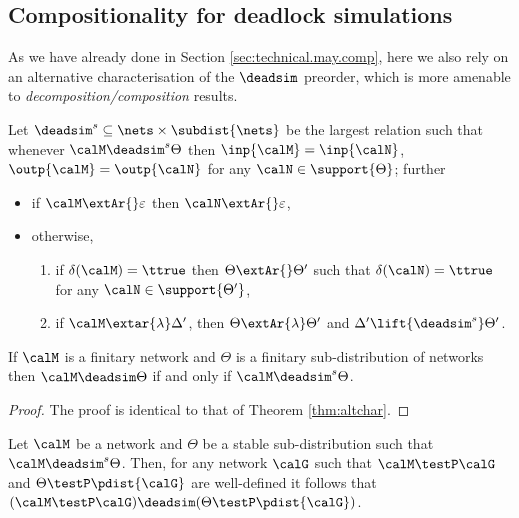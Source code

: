 \documentclass{LMCS}
\begin{document}
\subsection{Compositionality for deadlock simulations}
\label{sec:technical.must.comp}


As we have already done in Section \ref{sec:technical.may.comp},
here we also rely on an alternative characterisation of the 
$\deadsim$ preorder, which is more amenable to \emph{decomposition/composition}
results.



\begin{defi}
Let $\deadsim^s \subseteq \nets \times \subdist{\nets}$ be 
the largest relation such that whenever $\calM \deadsim^s \Theta$ 
then $\inp{\calM} = \inp{\calN}$, $\outp{\calM} = \outp{\calN}$ 
for any $\calN \in \support{\Theta}$; further 
\begin{itemize}
\item if $\calM \extAr{} \varepsilon$ then $\calN \extAr{}\varepsilon$, 
\item otherwise, 
\begin{enumerate}[label=(\roman*)]
	\item if $\delta(\calM) = \ttrue$ then $\Theta \extAr{} \Theta'$ 
	such that $\delta(\calN) = \ttrue$ for any $\calN \in \support{\Theta'}$, 
	\item if $\calM \extar{\lambda} \Delta'$, then $\Theta \extAr{\lambda} 
	\Theta'$ and $\Delta' \lift{\deadsim^s} \Theta'$.
\end{enumerate}
\end{itemize}
\end{defi}

\begin{thm}
\label{thm:ds.altchar}
If $\calM$ is a finitary network and $\Theta$ is a finitary 
sub-distribution of networks then 
$\calM \deadsim \Theta$ if and only if $\calM \deadsim^s \Theta$.
\end{thm}

\begin{proof}
The proof is identical to that of Theorem \ref{thm:altchar}.
\end{proof}

\begin{thm}
\label{thm:ds.single.comp}
Let $\calM$ be a network and $\Theta$ be a stable sub-distribution 
such that $\calM \deadsim^s \Theta$. Then, for any network 
$\calG$ such that $\calM \testP \calG$ and 
$\Theta \testP \pdist{\calG}$ are well-defined it follows 
that $(\calM \testP \calG) \deadsim (\Theta \testP \pdist{\calG})$. 
\end{thm}
\end{document}
